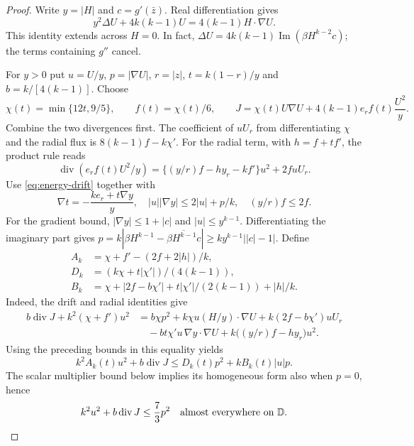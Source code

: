 \documentclass[11pt]{article}
\newcommand{\D}{\mathbb D}
\begin{document}
	\begin{proof}
		Write $y=|H|$ and $c=g'(\bar z)$.  Real differentiation gives
		\begin{equation}\label{eq:energy-drift}
			y^2\Delta U+4k(k-1)U=4(k-1)H\cdot\nabla U.
		\end{equation}
		This identity extends across $H=0$. In fact,
		$\Delta U=4k(k-1)\operatorname{Im}(\beta H^{k-2}c)$;
		the terms containing $g''$ cancel.  
		
		For $y>0$ put $u=U/y$, $p=|\nabla U|$, $r=|z|$, $t=k(1-r)/y$
		and $b=k/[4(k-1)]$. Choose
		\[
		\chi(t)=\min\{12t,9/5\},\qquad f(t)=\chi(t)/6,\qquad
		J=\chi(t)U\nabla U+4(k-1)e_r f(t)\frac{U^2}{y}.
		\]
		Combine the two divergences first. The coefficient of $uU_r$
		from differentiating $\chi$ and the radial flux is
		$8(k-1)f-k\chi'$. For the radial term,
		with $h=f+tf'$, the product rule reads
		\begin{equation}\label{eq:energy-radial-identity}
			\operatorname{div}\left(e_r f(t)U^2/y\right)
			=\{(y/r)f-hy_r-kf'\}u^2+2fuU_r.
		\end{equation}
		Use \eqref{eq:energy-drift} together with
		\[
		\nabla t=-\frac{ke_r+t\nabla y}{y},\quad
		|u||\nabla y|\leq2|u|+p/k,\quad
		(y/r)f\leq2f.
		\]
		For the gradient bound, $|\nabla y|\leq1+|c|$ and $|u|\leq y^{k-1}$.
		Differentiating the imaginary part gives
		$p=k|\beta H^{k-1}-\overline{\beta H^{k-1}c}|
		\geq k y^{k-1}\bigl||c|-1\bigr|$.
		Define
		\begin{align*}
			A_k&=\chi+f'-(2f+2|h|)/k,\\
			D_k&=(k\chi+t|\chi'|)/(4(k-1)),\\
			B_k&=\chi+|2f-b\chi'|+t|\chi'|/(2(k-1))+|h|/k .
		\end{align*}
		Indeed, the drift and radial identities give
		\begin{align*}
			b\operatorname{div}J+k^2(\chi+f')u^2
			&=b\chi p^2+k\chi u(H/y)\cdot\nabla U
			+k(2f-b\chi')uU_r\\
			&\quad-bt\chi' u\,\nabla y\cdot\nabla U
			+k\bigl((y/r)f-hy_r\bigr)u^2 .
		\end{align*}
		Using the preceding bounds in this equality yields
		\[
		k^2A_k(t)u^2+b\operatorname{div}J
		\leq D_k(t)p^2+kB_k(t)|u|p.
		\]
		The scalar multiplier bound below implies its homogeneous form
		also when $p=0$, hence
		\begin{equation}\label{eq:energy-pointwise-flux}
			k^2u^2+b\operatorname{div}J\leq\frac73 p^2
			\quad\hbox{almost everywhere on }\D.
		\end{equation}
		

\end{proof}
\end{document}
